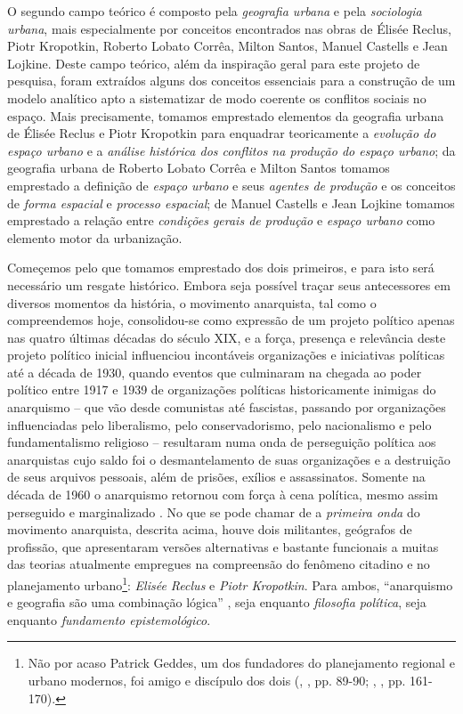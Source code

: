 O segundo campo teórico é composto pela \textit{geografia urbana} e pela \textit{sociologia urbana}, mais especialmente por conceitos encontrados nas obras de Élisée Reclus, Piotr Kropotkin, Roberto Lobato Corrêa, Milton Santos, Manuel Castells e Jean Lojkine. Deste campo teórico, além da inspiração geral para este projeto de pesquisa, foram extraídos alguns dos conceitos essenciais para a construção de um modelo analítico apto a sistematizar de modo coerente os conflitos sociais no espaço. Mais precisamente, tomamos emprestado elementos da geografia urbana de Élisée Reclus e Piotr Kropotkin para enquadrar teoricamente a \textit{evolução do espaço urbano} e a \textit{análise histórica dos conflitos na produção do espaço urbano}; da geografia urbana de Roberto Lobato Corrêa e Milton Santos tomamos emprestado a definição de \textit{espaço urbano} e seus \textit{agentes de produção} e os conceitos de \textit{forma espacial} e \textit{processo espacial}; de Manuel Castells e Jean Lojkine tomamos emprestado a relação entre \textit{condições gerais de produção} e \textit{espaço urbano} como elemento motor da urbanização.

Começemos pelo que tomamos emprestado dos dois primeiros, e para isto será necessário um resgate histórico. Embora seja possível traçar seus antecessores em diversos momentos da história, o movimento anarquista, tal como o compreendemos hoje, consolidou-se como expressão de um projeto político apenas nas quatro últimas décadas do século XIX, e a força, presença e relevância deste projeto político inicial influenciou incontáveis organizações e iniciativas políticas até a década de 1930, quando eventos que culminaram na chegada ao poder político entre 1917 e 1939 de organizações políticas historicamente inimigas do anarquismo -- que vão desde comunistas até fascistas, passando por organizações influenciadas pelo liberalismo, pelo conservadorismo, pelo nacionalismo e pelo fundamentalismo religioso -- resultaram numa onda de perseguição política aos anarquistas cujo saldo foi o desmantelamento de suas organizações e a destruição de seus arquivos pessoais, além de prisões, exílios e assassinatos. Somente na década de 1960 o anarquismo retornou com força à cena política, mesmo assim perseguido e marginalizado \cite{WOODCOCK2008}. No que se pode chamar de a \textit{primeira onda} do movimento anarquista, descrita acima, houve dois militantes, geógrafos de profissão, que apresentaram versões alternativas e bastante funcionais a muitas das teorias atualmente empregues na compreensão do fenômeno citadino e no planejamento urbano\footnote{Não por acaso Patrick Geddes, um dos fundadores do planejamento regional e urbano modernos, foi amigo e discípulo dos dois (\citeauthor{dunbar_elisee_1989}, \citeyear{dunbar_elisee_1989}, pp. 89-90; \citeauthor{hall_cidades_2007}, \citeyear{hall_cidades_2007}, pp. 161-170).}: \textit{Elisée Reclus }e \textit{Piotr Kropotkin}. Para ambos, ``anarquismo e geografia são uma combinação lógica'' \cite[p.~78]{dunbar_elisee_1989}, seja enquanto \textit{filosofia política}, seja enquanto \textit{fundamento epistemológico}.

